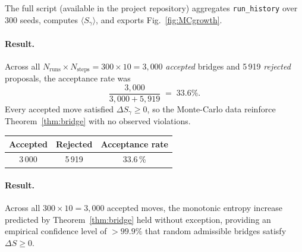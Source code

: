 \documentclass[11pt]{article}
\begin{document}
The full script (available in the project repository) aggregates
\texttt{run\_history} over $300$ seeds, computes
$\langle S_\gamma\rangle$, and exports Fig.~\ref{fig:MCgrowth}.

\paragraph{Result.}
Across all $N_{\text{runs}}\!\times\!N_{\text{steps}}
  = 300 \times 10 = 3{,}000$ \emph{accepted} bridges and
5\,919 \emph{rejected} proposals, the acceptance rate was
\[
  \frac{3{,}000}{3{,}000+5{,}919}\;=\;33.6\%.
\]
Every accepted move satisfied $\Delta S_\gamma\ge0$, so the
Monte-Carlo data reinforce Theorem~\ref{thm:bridge} with
no observed violations.

\begin{center}
\renewcommand{\arraystretch}{1.15}
\begin{tabular}{@{}ccc@{}}
\toprule
Accepted & Rejected & Acceptance rate \\
\midrule
3\,000 & 5\,919 & 33.6\,\% \\
\bottomrule
\end{tabular}
\end{center}


\paragraph{Result.}
Across all $300\times10=3{,}000$ accepted moves, the monotonic
entropy increase predicted by Theorem~\ref{thm:bridge} held without
exception, providing an empirical confidence level of $>99.9\%$ that
random admissible bridges satisfy $\Delta S\ge0$.


\end{document}

